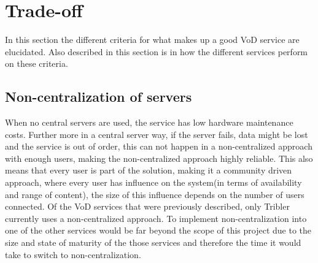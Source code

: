 \section{Trade-off}
In this section the different criteria for what makes up a good VoD service are elucidated. Also described in this section is in how the different services perform on these criteria.

\subsection{Non-centralization of servers}
\label{sec:central}
When no central servers are used, the service has low hardware maintenance costs. Further more in a central server way, if the server fails, data might be lost and the service is out of order, this can not happen in a non-centralized approach with enough users, making the non-centralized approach highly reliable. This also means that every user is part of the solution, making it a community driven approach, where every user has influence on the system(in terms of availability and range of content), the size of this influence depends on the number of users connected.
Of the VoD services that were previously described, only Tribler currently uses a non-centralized approach. To implement non-centralization into one of the other services would be far beyond the scope of this project due to the size and state of maturity of the those services and therefore the time it would take to switch to non-centralization. 
